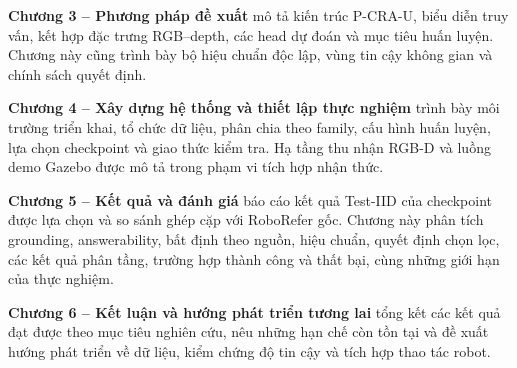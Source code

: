 \textbf{Chương 3 -- Phương pháp đề xuất} mô tả kiến trúc P-CRA-U, biểu diễn truy vấn, kết hợp đặc trưng RGB--depth, các head dự đoán và mục tiêu huấn luyện. Chương này cũng trình bày bộ hiệu chuẩn độc lập, vùng tin cậy không gian và chính sách quyết định.

\textbf{Chương 4 -- Xây dựng hệ thống và thiết lập thực nghiệm} trình bày môi trường triển khai, tổ chức dữ liệu, phân chia theo family, cấu hình huấn luyện, lựa chọn checkpoint và giao thức kiểm tra. Hạ tầng thu nhận RGB-D và luồng demo Gazebo được mô tả trong phạm vi tích hợp nhận thức.

\textbf{Chương 5 -- Kết quả và đánh giá} báo cáo kết quả Test-IID của checkpoint được lựa chọn và so sánh ghép cặp với RoboRefer gốc. Chương này phân tích grounding, answerability, bất định theo nguồn, hiệu chuẩn, quyết định chọn lọc, các kết quả phân tầng, trường hợp thành công và thất bại, cùng những giới hạn của thực nghiệm.

\textbf{Chương 6 -- Kết luận và hướng phát triển tương lai} tổng kết các kết quả đạt được theo mục tiêu nghiên cứu, nêu những hạn chế còn tồn tại và đề xuất hướng phát triển về dữ liệu, kiểm chứng độ tin cậy và tích hợp thao tác robot.

